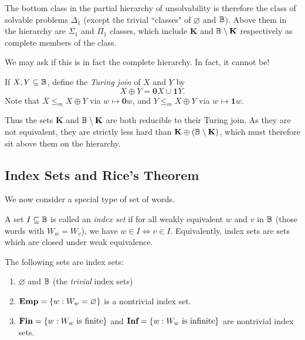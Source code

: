 \documentclass{article}
\begin{document}
The bottom class in the partial hierarchy of unsolvability is therefore the class of solvable problems $\Delta_1$ (except the trivial ``classes" of $\varnothing$ and $\mathbb{B}$). Above them in the hierarchy are $\Sigma_1$ and $\Pi_1$ classes, which include $\mathbf{K}$ and $\mathbb{B} \setminus \mathbf{K}$ respectively as complete members of the class.

We may ask if this is in fact the complete hierarchy. In fact, it cannot be!

\begin{definition}
	\label{turing-join}
	If $X, Y \subseteq \mathbb{B}$, define the \textit{Turing join} of $X$ and $Y$ by
	\[
		X \oplus Y = \textbf{0}X \cup \textbf{1}Y.
	\]
	Note that $X \leq_m X \oplus Y$ via $w \mapsto \textbf{0}w$, and $Y \leq_m X \oplus Y$ via $w \mapsto \textbf{1}w$.
\end{definition}

Thus the sets $\mathbf{K}$ and $\mathbb{B} \setminus \mathbf{K}$ are both reducible to their Turing join. As they are not equivalent, they are strictly less hard than $\mathbf{K} \oplus (\mathbb{B} \setminus \mathbf{K})$, which must therefore sit above them on the hierarchy.

\subsection{Index Sets and Rice's Theorem}

We now consider a special type of set of words.

\begin{definition}
	A set $I \subseteq \mathbb{B}$ is called an \textit{index set} if for all weakly equivalent $w$ and $v$ in $\mathbb{B}$ (those words with $W_w = W_v$), we have $w \in I \iff v \in I$. Equivalently, index sets are sets which are closed under weak equivalence.
\end{definition}

\begin{example}
	The following sets are index sets:
	\begin{enumerate}
		\item $\varnothing$ and $\mathbb{B}$ (the \textit{trivial} index sets)
		\item $\textbf{Emp} = \left\lbrace w: W_w = \varnothing \right\rbrace$ is a nontrivial index set.
		\item $\textbf{Fin} = \left\lbrace w: W_w \text{ is finite} \right\rbrace$ and $\textbf{Inf} = \left\lbrace w: W_w \text{ is infinite} \right\rbrace$ are nontrivial index sets. 
	\end{enumerate}
\end{example}
\end{document}
